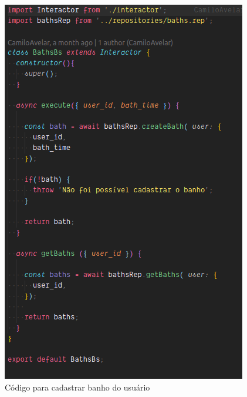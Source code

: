\begin{figure}[htbp]
	\centering
	\includegraphics[width=1\linewidth]{figuras/userservice/baths.png}
	\caption{Código para cadastrar banho do usuário}
	\label{fig:cadastra-banho}
\end{figure}

